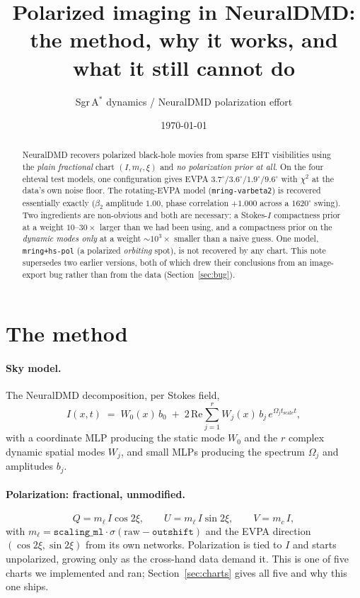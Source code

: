 \documentclass[11pt]{article}
\title{Polarized imaging in NeuralDMD:\\ the method, why it works, and what it still cannot do}
\author{Sgr\,A$^\ast$ dynamics / NeuralDMD polarization effort}
\date{\today}
\begin{document}
\maketitle

\begin{abstract}
\noindent
NeuralDMD recovers polarized black-hole movies from sparse EHT visibilities using the
\emph{plain fractional} chart $(I,m_\ell,\xi)$ and \emph{no polarization prior at all}.
On the four ehteval test models, one configuration gives EVPA
$3.7^\circ/3.6^\circ/1.9^\circ/9.6^\circ$ with $\chi^2$ at the data's own noise floor.
The rotating-EVPA model (\texttt{mring-varbeta2}) is recovered essentially exactly
($\beta_2$ amplitude $1.00$, phase correlation $+1.000$ across a $1620^\circ$ swing).
Two ingredients are non-obvious and both are necessary: a Stokes-$I$ compactness prior
at a weight $10$--$30\times$ larger than we had been using, and a compactness prior on
the \emph{dynamic modes only} at a weight $\sim10^{3}\times$ smaller than a naive
guess. One model, \texttt{mring+hs-pol} (a polarized \emph{orbiting} spot), is not
recovered by any chart. This note supersedes two earlier versions, both of which drew
their conclusions from an image-export bug rather than from the data
(Section~\ref{sec:bug}).
\end{abstract}

\section{The method}
\label{sec:method}

\paragraph{Sky model.} The NeuralDMD decomposition, per Stokes field,
\begin{equation}
  I(x,t) \;=\; W_0(x)\,b_0 \;+\; 2\,\mathrm{Re}\!\sum_{j=1}^{r} W_j(x)\,b_j\,
  e^{\Omega_j t_{\mathrm{scale}} t},
  \label{eq:dmd}
\end{equation}
with a coordinate MLP producing the static mode $W_0$ and the $r$ complex dynamic
spatial modes $W_j$, and small MLPs producing the spectrum $\Omega_j$ and amplitudes
$b_j$.

\paragraph{Polarization: fractional, unmodified.}
\begin{equation}
  Q = m_\ell\,I\cos 2\xi, \qquad U = m_\ell\,I\sin 2\xi, \qquad V = m_c\,I,
\end{equation}
with $m_\ell=\texttt{scaling\_ml}\cdot\sigma(\text{raw}-\texttt{outshift})$ and the EVPA
direction $(\cos2\xi,\sin2\xi)$ from its own networks. Polarization is tied to $I$ and
starts unpolarized, growing only as the cross-hand data demand it. This is one of five
charts we implemented and ran; Section~\ref{sec:charts} gives all five and why this one
ships.
\end{document}
